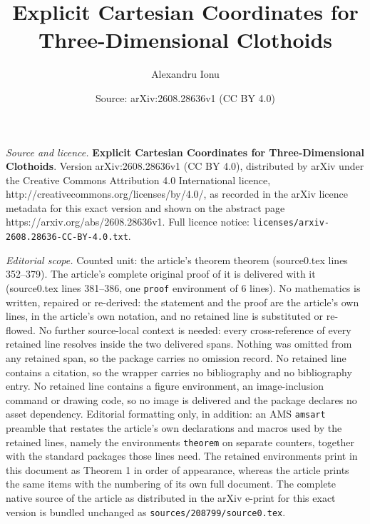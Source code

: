 \documentclass[10pt,a4paper]{amsart}
\title{\vspace{-12mm}\textbf{Explicit Cartesian Coordinates for Three-Dimensional Clothoids}}
\author{Alexandru Ionu\textcommabelow{t}}
\date{Source: arXiv:2608.28636v1 (CC BY 4.0)}
\begin{document}
\maketitle

\noindent\emph{Source and licence.} \vspace{-12mm}\textbf{Explicit Cartesian Coordinates for Three-Dimensional Clothoids}. Version arXiv:2608.28636v1 (CC BY 4.0), distributed by arXiv under the Creative Commons Attribution 4.0 International licence, http://creativecommons.org/licenses/by/4.0/, as recorded in the arXiv licence metadata for this exact version and shown on the abstract page https://arxiv.org/abs/2608.28636v1. Full licence notice: \texttt{licenses/arxiv-2608.28636-CC-BY-4.0.txt}.\par\smallskip

\noindent\textit{Editorial scope.} Counted unit: the article's theorem theorem (source0.tex lines 352--379). The article's complete original proof of it is delivered with it (source0.tex lines 381--386, one \texttt{proof} environment of 6 lines). No mathematics is written, repaired or re-derived: the statement and the proof are the article's own lines, in the article's own notation, and no retained line is substituted or re-flowed.  No further source-local context is needed: every cross-reference of every retained line resolves inside the two delivered spans.  Nothing was omitted from any retained span, so the package carries no omission record.  No retained line contains a citation, so the wrapper carries no bibliography and no bibliography entry.  No retained line contains a figure environment, an image-inclusion command or drawing code, so no image is delivered and the package declares no asset dependency.  Editorial formatting only, in addition: an AMS \texttt{amsart} preamble that restates the article's own declarations and macros used by the retained lines, namely the environments \texttt{theorem} on separate counters, together with the standard packages those lines need.  The retained environments print in this document as Theorem 1 in order of appearance, whereas the article prints the same items with the numbering of its own full document.  The complete native source of the article as distributed in the arXiv e-print for this exact version is bundled unchanged as \texttt{sources/208799/source0.tex}.
\end{document}
